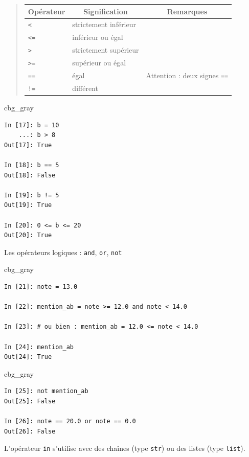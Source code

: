\documentclass[%
oneside,                 %
final,                   %
10pt]{article}
\newenvironment{_cod_tight}[1]{
   \def\FrameCommand{\colorbox{#1}}
   \FrameRule0.6pt\MakeFramed {\FrameRestore}\vskip3mm}
   {\vskip0mm\endMakeFramed}
\newenvironment{cod}[1]{
\bgroup\rmfamily
\fboxsep=0mm\relax
\begin{_cod_tight}{#1}
\list{}{\parsep=-2mm\parskip=0mm\topsep=0pt\leftmargin=2mm
\rightmargin=2\leftmargin\leftmargin=4pt\relax}
\item\relax}
{\endlist\end{_cod_tight}\egroup}
\begin{document}
\begin{quote}
\begin{tabular}{lll}
\hline
\multicolumn{1}{c}{ Opérateur } & \multicolumn{1}{c}{ Signification } & \multicolumn{1}{c}{ Remarques } \\
\hline
\texttt{<}  & strictement inférieur &                                   \\
\texttt{<=} & inférieur ou égal     &                                   \\
\texttt{>}  & strictement supérieur &                                   \\
\texttt{>=} & supérieur ou égal     &                                   \\
\texttt{==} & égal                  & Attention : deux signes \texttt{==} \\
\Verb?!=? & différent             &                                   \\
\hline
\end{tabular}
\end{quote}

\noindent
\begin{cod}{cbg_gray}\begin{verbatim}
In [17]: b = 10
    ...: b > 8
Out[17]: True

In [18]: b == 5
Out[18]: False

In [19]: b != 5
Out[19]: True

In [20]: 0 <= b <= 20
Out[20]: True
\end{verbatim}
\end{cod}
\noindent

Les opérateurs logiques : \texttt{and}, \texttt{or}, \texttt{not}

\begin{cod}{cbg_gray}\begin{verbatim}
In [21]: note = 13.0

In [22]: mention_ab = note >= 12.0 and note < 14.0

In [23]: # ou bien : mention_ab = 12.0 <= note < 14.0

In [24]: mention_ab
Out[24]: True
\end{verbatim}
\end{cod}
\noindent

\begin{cod}{cbg_gray}\begin{verbatim}
In [25]: not mention_ab
Out[25]: False

In [26]: note == 20.0 or note == 0.0
Out[26]: False
\end{verbatim}
\end{cod}
\noindent
L'opérateur \texttt{in} s'utilise avec des chaînes (type \texttt{str}) ou des listes (type \texttt{list}).
\end{document}
